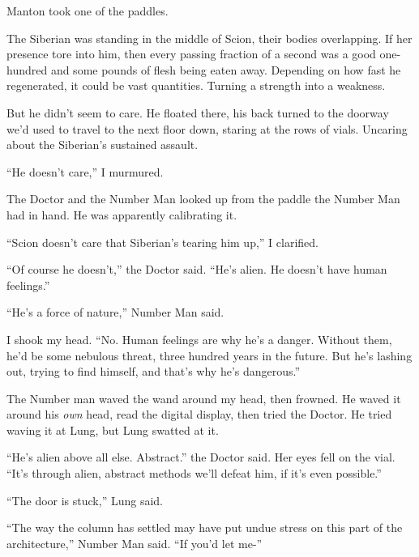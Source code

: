 Manton took one of the paddles.



The Siberian was standing in the middle of Scion, their bodies overlapping.  If her presence tore into him, then every passing fraction of a second was a good one-hundred and some pounds of flesh being eaten away.  Depending on how fast he regenerated, it could be vast quantities.  Turning a strength into a weakness.



But he didn't seem to care.  He floated there, his back turned to the doorway we'd used to travel to the next floor down, staring at the rows of vials.  Uncaring about the Siberian's sustained assault.



``He doesn't care,'' I murmured.



The Doctor and the Number Man looked up from the paddle the Number Man had in hand.  He was apparently calibrating it.



``Scion doesn't care that Siberian's tearing him up,'' I clarified.



``Of course he doesn't,'' the Doctor said.  ``He's alien.  He doesn't have human feelings.''



``He's a force of nature,'' Number Man said.



I shook my head.  ``No.  Human feelings are why he's a danger.  Without them, he'd be some nebulous threat, three hundred years in the future.  But he's lashing out, trying to find himself, and that's why he's dangerous.''



The Number man waved the wand around my head, then frowned.  He waved it around his \emph{own} head, read the digital display, then tried the Doctor.  He tried waving it at Lung, but Lung swatted at it.



``He's alien above all else.  Abstract.'' the Doctor said.  Her eyes fell on the vial.  ``It's through alien, abstract methods we'll defeat him, if it's even possible.''



``The door is stuck,'' Lung said.



``The way the column has settled may have put undue stress on this part of the architecture,'' Number Man said.  ``If you'd let me-''



